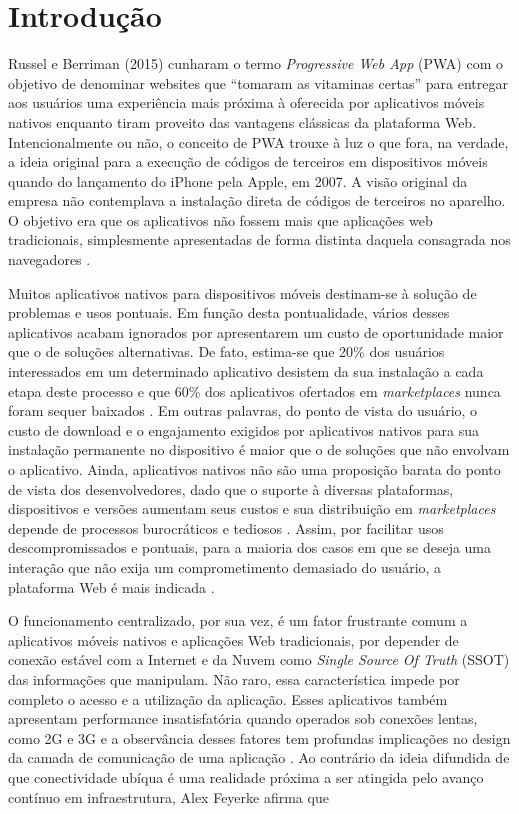 \documentclass[
	article,			%
	12pt,				%
	oneside,			%
	a4paper,			%
	english,			%
	brazil,				%
	sumario=tradicional
	]{abntex2}
\begin{document}
\section*{Introdução}


Russel e Berriman (2015) cunharam o termo \textit{Progressive Web App} (PWA) com o objetivo de denominar websites que “tomaram as vitaminas certas” \cite{russel-2015} para entregar aos usuários uma experiência mais próxima à oferecida por aplicativos móveis nativos enquanto tiram proveito das vantagens clássicas da plataforma Web. Intencionalmente ou não, o conceito de PWA trouxe à luz o que fora, na verdade, a ideia original para a execução de códigos de terceiros em dispositivos móveis quando do lançamento do iPhone pela Apple, em 2007. A visão original da empresa não contemplava a instalação direta de códigos de terceiros no aparelho. O objetivo era que os aplicativos não fossem mais que aplicações web tradicionais, simplesmente apresentadas de forma distinta daquela consagrada nos navegadores \cite{9to5-2011}.

Muitos aplicativos nativos para dispositivos móveis destinam-se à solução de problemas e usos pontuais. Em função desta pontualidade, vários desses aplicativos acabam ignorados por apresentarem um custo de oportunidade maior que o de soluções alternativas. De fato, estima-se que 20\% dos usuários interessados em um determinado aplicativo desistem da sua instalação a cada etapa deste processo \cite{cselle-2012} e que 60\% dos aplicativos ofertados em \textit{marketplaces} nunca foram sequer baixados \cite{thygesen-2013}. Em outras palavras, do ponto de vista do usuário, o custo de download e o engajamento exigidos por aplicativos nativos para sua instalação permanente no dispositivo é maior que o de soluções que não envolvam o aplicativo. Ainda, aplicativos nativos não são uma proposição barata do ponto de vista dos desenvolvedores, dado que o suporte à diversas plataformas, dispositivos e versões aumentam seus custos e sua distribuição em \textit{marketplaces} depende de processos burocráticos e tediosos \cite{kumar-2016}. Assim, por facilitar usos descompromissados e pontuais, para a maioria dos casos em que se deseja uma interação que não exija um comprometimento demasiado do usuário, a plataforma Web é mais indicada \cite{lopes-2016}.

O funcionamento centralizado, por sua vez, é um fator frustrante comum a aplicativos móveis nativos e aplicações Web tradicionais, por depender de conexão estável com a Internet e da Nuvem como \textit{Single Source Of Truth} (SSOT) das informações que manipulam.  Não raro, essa característica impede por completo o acesso e a utilização da aplicação. Esses aplicativos também apresentam performance insatisfatória quando operados sob conexões lentas, como 2G e 3G e a observância desses fatores tem profundas implicações no design da camada de comunicação de uma aplicação \cite{prasad-2011}. Ao contrário da ideia difundida de que conectividade ubíqua é uma realidade próxima a ser atingida pelo avanço contínuo em infraestrutura, Alex Feyerke afirma que
\end{document}
